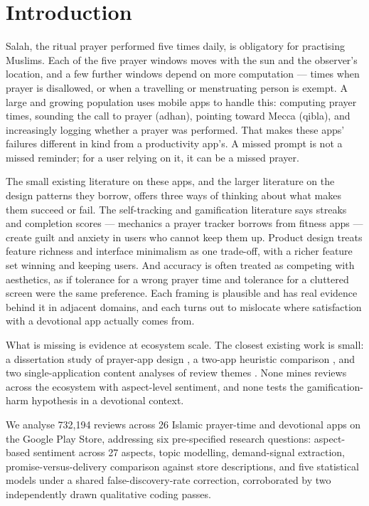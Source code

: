 
\section{Introduction}
\label{sec:introduction}

Salah, the ritual prayer performed five times daily, is obligatory for
practising Muslims. Each of the five prayer windows moves with the sun and the
observer's location, and a few further windows depend on more computation ---
times when prayer is disallowed, or when a travelling or menstruating person is
exempt. A large and growing population uses mobile apps to handle this:
computing prayer times, sounding the call to prayer (adhan), pointing toward
Mecca (qibla), and increasingly logging whether a prayer was performed. That
makes these apps' failures different in kind from a productivity app's. A
missed prompt is not a missed reminder; for a user relying on it, it can be a
missed prayer.

The small existing literature on these apps, and the larger literature on the
design patterns they borrow, offers three ways of thinking about what makes
them succeed or fail. The self-tracking and gamification literature says
streaks and completion scores --- mechanics a prayer tracker borrows from
fitness apps --- create guilt and anxiety in users who cannot keep them up.
Product design treats feature richness and interface minimalism as one
trade-off, with a richer feature set winning and keeping users. And accuracy is
often treated as competing with aesthetics, as if tolerance for a wrong prayer
time and tolerance for a cluttered screen were the same preference. Each
framing is plausible and has real evidence behind it in adjacent domains, and
each turns out to mislocate where satisfaction with a devotional app actually
comes from.

What is missing is evidence at ecosystem scale. The closest existing work is
small: a dissertation study of prayer-app design \citep{bellar2017ipray}, a
two-app heuristic comparison \citep{azahari2025comparative}, and two
single-application content analyses of review themes
\citep{noor2025halaltourism,noor2026halalsuperapps}. None mines reviews across
the ecosystem with aspect-level sentiment, and none tests the
gamification-harm hypothesis in a devotional context.

We analyse 732,194 reviews across 26 Islamic prayer-time and devotional apps on
the Google Play Store, addressing six pre-specified research questions:
aspect-based sentiment across 27 aspects, topic modelling, demand-signal
extraction, promise-versus-delivery comparison against store descriptions, and
five statistical models under a shared false-discovery-rate correction,
corroborated by two independently drawn qualitative coding passes.


